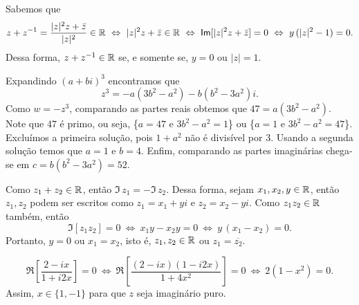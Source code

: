 \begin{questions}
\begin{solution}
    Sabemos que
    \begin{align*}
        z+z^{-1} = \frac{|z|^2 z + \bar{z}}{|z|^2} \in {\mathbb R}
        ~\Leftrightarrow~ |z|^2 z + \bar{z} \in {\mathbb R}
        ~\Leftrightarrow~ \mathsf{Im}[|z|^2 z + \bar{z}] = 0
        ~\Leftrightarrow~ y\,(|z|^2-1) = 0.
    \end{align*}
    Dessa forma, $z + z^{-1} \in {\mathbb R}$ se, e somente se, $y=0$ ou $|z|=1$.
\end{solution}

\begin{solution}
    Expandindo $(a+bi)^3$ encontramos que
    \[z^3 = -a(3b^2-a^2) - b(b^2-3a^2)i.\]
    Como $w=-z^3$, comparando as partes reais obtemos que $47 = a(3b^2-a^2)$.
    Note que $47$ é primo, ou seja, \{$a=47$ e $3b^2-a^2=1$\} ou \{$a=1$ e $3b^2-a^2=47$\}. Excluímos a primeira solução, pois $1+a^2$ não é divisível por 3.
    Usando a segunda solução temos que $a=1$ e $b=4$.
    Enfim, comparando as partes imaginárias chega-se em $c = b(b^2-3a^2) = 52$.
\end{solution}


\begin{solution}
    Como $z_1+z_2\in{\mathbb R}$, então $\Im\,z_1 = -\Im\,z_2$. Dessa forma, sejam $x_1,x_2,y\in{\mathbb R}$, então $z_1,z_2$ podem ser escritos como $z_1 = x_1+yi$ e $z_2=x_2-yi$. Como $z_1 z_2\in{\mathbb R}$ também, então
    \[
        \Im[z_1 z_2] = 0
        ~\Leftrightarrow~ x_1 y-x_2 y = 0
        ~\Leftrightarrow~ y\,(x_1 - x_2) = 0.
    \]
    Portanto, $y=0$ ou $x_1=x_2$, isto é, $z_1,z_2\in{\mathbb R}$ ou $z_1 = \overline{z_2}$.
\end{solution}


\begin{solution}
    \[
        \Re\left[\frac{2 - ix}{1 + i2x}\right] = 0
        ~\Leftrightarrow~ \Re\left[\frac{(2 - ix)(1-i2x)}{1 + 4x^2}\right] = 0
        ~\Leftrightarrow~ 2(1-x^2) = 0.
    \]
    Assim, $x\in\{1,-1\}$ para que $z$ seja imaginário puro.
\end{solution}


\end{questions}
